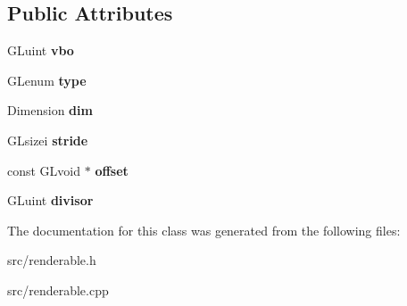 \subsection*{Public Attributes}
\begin{DoxyCompactItemize}
\item 
\hypertarget{class_attribute_a5eff3a5f5d606957c65579b952dacbbc}{}G\+Luint {\bfseries vbo}\label{class_attribute_a5eff3a5f5d606957c65579b952dacbbc}

\item 
\hypertarget{class_attribute_ad053c6716a9ad5686bf16dd0d96c3a38}{}G\+Lenum {\bfseries type}\label{class_attribute_ad053c6716a9ad5686bf16dd0d96c3a38}

\item 
\hypertarget{class_attribute_a1a2ccd748b39f5533a04d89e53de59f8}{}Dimension {\bfseries dim}\label{class_attribute_a1a2ccd748b39f5533a04d89e53de59f8}

\item 
\hypertarget{class_attribute_af80cc5c521bd8c158c0a8b56d83f11df}{}G\+Lsizei {\bfseries stride}\label{class_attribute_af80cc5c521bd8c158c0a8b56d83f11df}

\item 
\hypertarget{class_attribute_afbde769206a46942e1ab5f3181279668}{}const G\+Lvoid $\ast$ {\bfseries offset}\label{class_attribute_afbde769206a46942e1ab5f3181279668}

\item 
\hypertarget{class_attribute_a888e509f2b818bdd28368dfc198e53e9}{}G\+Luint {\bfseries divisor}\label{class_attribute_a888e509f2b818bdd28368dfc198e53e9}

\end{DoxyCompactItemize}


The documentation for this class was generated from the following files\+:\begin{DoxyCompactItemize}
\item 
src/renderable.\+h\item 
src/renderable.\+cpp\end{DoxyCompactItemize}

